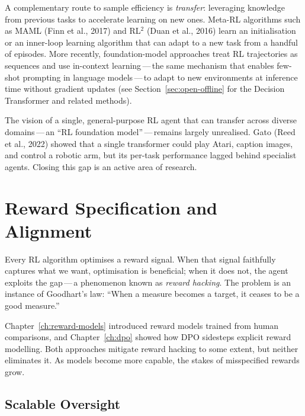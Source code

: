 A complementary route to sample efficiency is \emph{transfer}:
leveraging knowledge from previous tasks to accelerate learning on new
ones.  Meta-RL algorithms such as MAML (Finn et al., 2017) and
RL$^2$ (Duan et al., 2016) learn an initialisation or an inner-loop
learning algorithm that can adapt to a new task from a handful of
episodes.  More recently, foundation-model approaches treat RL
trajectories as sequences and use in-context learning\,---\,the same
mechanism that enables few-shot prompting in language models\,---\,to
adapt to new environments at inference time without gradient updates
(see Section~\ref{sec:open-offline} for the Decision Transformer and
related methods).

The vision of a single, general-purpose RL agent that can transfer
across diverse domains\,---\,an ``RL foundation model''\,---\,remains
largely unrealised.  Gato (Reed et al., 2022) showed that a single
transformer could play Atari, caption images, and control a robotic
arm, but its per-task performance lagged behind specialist agents.
Closing this gap is an active area of research.


\section{Reward Specification and Alignment}
\label{sec:open-alignment}

Every RL algorithm optimises a reward signal.  When that signal
faithfully captures what we want, optimisation is beneficial; when it
does not, the agent exploits the gap\,---\,a phenomenon known as
\emph{reward hacking}.  The problem is an instance of Goodhart's
law: ``When a measure becomes a target, it
ceases to be a good measure.''

Chapter~\ref{ch:reward-models} introduced reward models trained from
human comparisons, and Chapter~\ref{ch:dpo} showed how DPO sidesteps
explicit reward modelling.  Both approaches mitigate reward hacking to
some extent, but neither eliminates it.  As models become more
capable, the stakes of misspecified rewards grow.

\subsection{Scalable Oversight}

